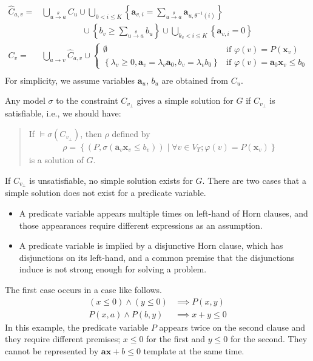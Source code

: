 \documentclass[a4paper,12pt]{article}
\newcommand{\edge}[2]{#1\rightarrow#2}
\newcommand{\edgel}[3]{#1\xrightarrow{#2}#3}
\begin{document}
\begin{align*}
\hat C_{a,v} = &
 \bigcup_{\edgel{u}{\theta}{a}} C_u \cup
 \bigcup_{0 < i \leq K}
 \left\lbrace
  \mathbf{a}_{v,i} = \sum_{\edgel{u}{\theta}{a}} \mathbf{a}_{u, \theta^{-1} (i)}
 \right\rbrace \\
 & \hspace{2cm} \cup
 \left\lbrace
  b_v \geq \sum_{\edgel{u}{\theta}{a}} b_u
 \right\rbrace \cup
 \bigcup_{k_v < i \leq K}
 \left\lbrace \mathbf{a}_{v,i} = 0 \right\rbrace
\\
C_v = & \bigcup_{\edge{a}{v}} \hat C_{a,v} \cup
\begin{cases}
\emptyset
& \mbox{if } \varphi(v) = P(\mathbf{x}_v) \\
\left\lbrace
 \lambda_v \geq 0, \mathbf{a}_v = \lambda_v \mathbf{a}_0,
 b_v = \lambda_v b_0
\right\rbrace
& \mbox{if } \varphi(v) = \mathbf{a}_0 \mathbf{x}_v \leq b_0
\end{cases} \\
\end{align*}
For simplicity, we assume variables $\mathbf{a}_u$, $b_u$ are obtained
from $C_u$.

Any model $\sigma$ to the constraint $C_{v_\bot}$ gives a simple
solution for $G$ if $C_{v_\bot}$ is satisfiable, i.e., we should have:

\begin{quote}
If $\models \sigma(C_{v_\bot})$, then $\rho$ defined by
\begin{align*}
 \rho = \left\lbrace
  \left( P, \sigma(\mathbf{a}_v \mathbf{x}_v \leq b_v) \right) \mid
  \forall v \in V_T; \varphi(v) = P(\mathbf{x}_v)
 \right\rbrace
\end{align*}
is a solution of $G$.
\end{quote}

If $C_{v_\bot}$ is unsatisfiable, no simple solution exists for $G$.
There are two cases that a simple solution does not exist for a
predicate variable.
\begin{itemize}
\item A predicate variable appears multiple times on left-hand of Horn
  clauses, and those appearances require different expressions as an
  assumption.
\item A predicate variable is implied by a disjunctive Horn clause,
  which has disjunctions on its left-hand, and a common premise that
  the disjunctions induce is not strong enough for solving a problem.
\end{itemize}

The first case occurs in a case like follows.
\begin{align*}
\left( x \leq 0 \right) \wedge \left( y \leq 0 \right) & \implies P(x,y) \\
P(x,a) \wedge P(b,y) & \implies x+y \leq 0
\end{align*}
In this example, the predicate variable $P$ appears twice on the
second clause and they require different premises; $x \leq 0$ for the
first and $y \leq 0$ for the second.  They cannot be represented by
$\mathbf{ax} + b \leq 0$ template at the same time.
\end{document}
